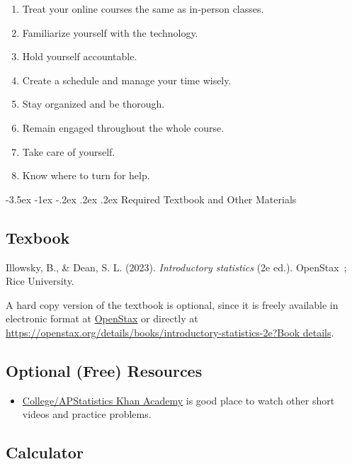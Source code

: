 \documentclass{article}
\makeatletter
\renewcommand\section{\@startsection{section}{1}{0pt}%
  {-3.5ex \@plus -1ex \@minus -.2ex}%
  {.2ex \@plus.2ex}%
  {\normalfont\Large\bfseries}} %
\makeatother
\begin{document}
\begin{enumerate}
\item Treat your online courses the same as in-person classes.
\item Familiarize yourself with the technology.
\item Hold yourself accountable.
\item Create a schedule and manage your time wisely.
\item Stay organized and be thorough.
\item Remain engaged throughout the whole course.
\item Take care of yourself.
\item Know where to turn for help.
\end{enumerate}

\section{Required Textbook and Other Materials}

\subsection{Texbook}

Illowsky, B., \& Dean, S. L. (2023). \textit{Introductory statistics} (2e ed.). OpenStax~; Rice University.

A hard copy version of the textbook is optional, since it is freely available in electronic format at \href{https://openstax.org/details/books/introductory-statistics-2e?Book\%20details}{OpenStax} or directly at \href{https://openstax.org/details/books/introductory-statistics-2e?Book\%20details}{https://openstax.org/details/books/introductory-statistics-2e?Book details}.

\subsection{Optional (Free) Resources}

\begin{itemize}
\item \href{https://www.khanacademy.org/math/ap-statistics}{College/AP\texttrademark  Statistics Khan Academy} is good place to watch other short videos and practice problems.
\end{itemize}

\subsection{Calculator}
\end{document}
